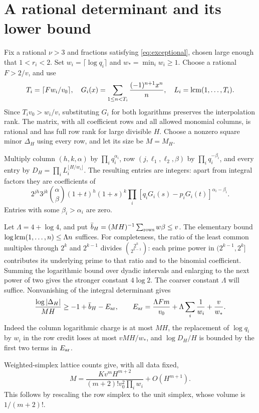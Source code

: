 \section{A rational determinant and its lower bound}\label{sec:arithmetic}

Fix a rational \(\nu>3\) and fractions satisfying \eqref{eq:exceptional}, chosen
large enough that \(1<r_i<2\). Set \(w_i=\lceil\log q_i\rceil\)
and \(w_* =\min_iw_i\geq1\). Choose a rational \(F>2/v\), and use
\[
 T_i=\lceil Fw_i/v_0\rceil,\quad
 G_i(x)=\sum_{1\leq n<T_i}\frac{(-1)^{n+1}x^n}{n},\quad
 L_i=\operatorname{lcm}(1,\ldots,T_i).
\]
Since \(T_iv_0>w_i/v\),
substituting \(G_i\) for both logarithms preserves the interpolation
rank. The matrix, with all coefficient rows and all allowed monomial
columns, is rational and has full row rank for large divisible \(H\).
Choose a nonzero square minor \(\Delta_H\) using every row, and let its
size be \(M=M_H\).

Multiply column \((h,k,\alpha)\) by \(\prod_iq_i^{\alpha_i}\),
row \((j,\ell_1,\ell_2,\beta)\) by \(\prod_iq_i^{-\beta_i}\),
and every entry by
\(D_H=\prod_i L_i^{\lfloor H/w_i\rfloor}\).
The resulting entries are integers: apart from integral factors they
are coefficients of
\[
 2^{jh}3^{jk}\binom\alpha\beta(1+t)^h(1+s)^k
              \prod_i[q_iG_i(s)-p_iG_i(t)]^{\alpha_i-\beta_i}.
\]
Entries with some \(\beta_i>\alpha_i\) are zero.

Let \(\Lambda=4+\log4\), and put
\(\bar b_H=(MH)^{-1}\sum_{\rm rows}w\beta\leq v\).
The elementary bound \(\log\operatorname{lcm}(1,\ldots,n)\leq\Lambda n\)
suffices. For completeness, the ratio of the least common multiples
through \(2^k\) and \(2^{k-1}\) divides
\(\binom{2^k}{2^{k-1}}\): each prime power in \((2^{k-1},2^k]\)
contributes its underlying prime to that ratio and to the binomial
coefficient. Summing the logarithmic bound over dyadic intervals
and enlarging to the next power of two
gives the stronger constant \(4\log2\). The coarser constant
\(\Lambda\) will suffice. Nonvanishing of the integral determinant gives
\begin{equation}\label{eq:arith}
 \frac{\log|\Delta_H|}{MH}\geq-1+\bar b_H-E_{\rm ar},\qquad
 E_{\rm ar}=\frac{\Lambda Fm}{v_0}
          +\Lambda\sum_i\frac1{w_i}+\frac v{w_*}.
\end{equation}
Indeed the column logarithmic charge is at most \(MH\), the replacement
of \(\log q_i\) by \(w_i\) in the row credit loses at most
\(vMH/w_*\), and \(\log D_H/H\) is bounded by the first two terms
in \(E_{\rm ar}\).

Weighted-simplex lattice counts give, with all data fixed,
\begin{equation}\label{eq:counts}
 M=\frac{Kv^mH^{m+2}}{(m+2)!v_0^2\prod_iw_i}+O(H^{m+1}).
\end{equation}
This follows by rescaling the row simplex to the unit simplex, whose
volume is \(1/(m+2)!\).
